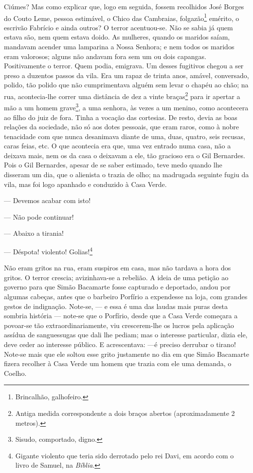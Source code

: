 Ciúmes? Mas como explicar que, logo em seguida, fossem recolhidos José
Borges do Couto Leme, pessoa estimável, o Chico das Cambraias,
folgazão\footnote{Brincalhão, galhofeiro.} emérito, o escrivão Fabrício
e ainda outros? O terror acentuou-se. Não se sabia já quem estava são,
nem quem estava doido. As mulheres, quando os maridos saíam, mandavam
acender uma lamparina a Nossa Senhora; e nem todos os maridos eram
valorosos; alguns não andavam fora sem um ou dois capangas.
Positivamente o terror. Quem podia, emigrava. Um desses fugitivos chegou
a ser preso a duzentos passos da vila. Era um rapaz de trinta anos,
amável, conversado, polido, tão polido que não cumprimentava alguém sem
levar o chapéu ao chão; na rua, acontecia-lhe correr uma distância de
dez a vinte braças\footnote{Antiga medida correspondente a dois braços
  abertos (aproximadamente 2 metros).} para ir apertar a mão a um homem
grave\footnote{Sisudo, comportado, digno.}, a uma senhora, às vezes a um
menino, como acontecera ao filho do juiz de fora. Tinha a vocação das
cortesias. De resto, devia as boas relações da sociedade, não só aos
dotes pessoais, que eram raros, como à nobre tenacidade com que nunca
desanimava diante de uma, duas, quatro, seis recusas, caras feias, etc.
O que acontecia era que, uma vez entrado numa casa, não a deixava mais,
nem os da casa o deixavam a ele, tão gracioso era o Gil Bernardes. Pois
o Gil Bernardes, apesar de se saber estimado, teve medo quando lhe
disseram um dia, que o alienista o trazia de olho; na madrugada seguinte
fugiu da vila, mas foi logo apanhado e conduzido à Casa Verde.

--- Devemos acabar com isto!

--- Não pode continuar!

--- Abaixo a tirania!

--- Déspota! violento! Golias!\footnote{Gigante violento que teria sido
  derrotado pelo rei Davi, em acordo com o livro de Samuel, na
  \emph{Bíblia}.}

Não eram gritos na rua, eram suspiros em casa, mas não tardava a hora
dos gritos. O terror crescia; avizinhava-se a rebelião. A ideia de uma
petição ao governo para que Simão Bacamarte fosse capturado e deportado,
andou por algumas cabeças, antes que o barbeiro Porfírio a expendesse na
loja, com grandes gestos de indignação. Note-se, --- e essa é uma das
laudas mais puras desta sombria história --- note-se que o Porfírio,
desde que a Casa Verde começara a povoar-se tão extraordinariamente, viu
crescerem-lhe os lucros pela aplicação assídua de sanguessugas que dali
lhe pediam; mas o interesse particular, dizia ele, deve ceder ao
interesse público. E acrescentava: ---é preciso derrubar o tirano!
Note-se mais que ele soltou esse grito justamente no dia em que Simão
Bacamarte fizera recolher à Casa Verde um homem que trazia com ele uma
demanda, o Coelho.


